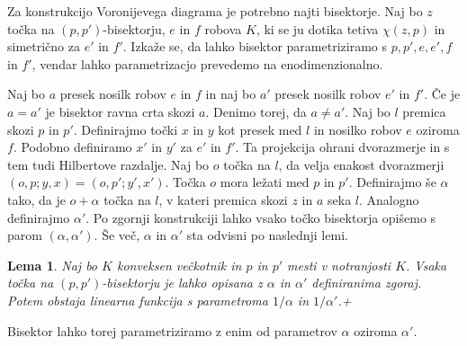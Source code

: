 \documentclass{article}
\newtheorem{lema}{Lema}
\begin{document}
Za konstrukcijo Voronijevega diagrama je potrebno najti bisektorje. Naj bo $z$ točka na $(p, p')$-bisektorju, $e$ in $f$ robova $K$, ki se ju dotika tetiva $\chi (z, p)$ in simetrično za $e'$ in $f'$.
Izkaže se, da lahko bisektor parametriziramo s $p, p', e, e', f$ in $f'$, vendar lahko parametrizacjo prevedemo na enodimenzionalno. 

Naj bo $a$ presek nosilk robov $e$ in $f$ in naj bo $a'$ presek nosilk robov $e'$ in $f'$. Če je $a = a'$ je bisektor ravna crta skozi $a$. Denimo torej, da $a \neq a'$. 
Naj bo $l$ premica skozi $p$ in $p'$. Definirajmo točki $x$ in $y$ kot presek med $l$ in nosilko robov $e$ oziroma $f$. Podobno definiramo $x'$ in $y'$ za $e'$ in $f'$.
Ta projekcija ohrani dvorazmerje in s tem tudi Hilbertove razdalje.
Naj bo $o$ točka na $l$, da velja enakost dvorazmerji $(o, p; y, x) = (o, p'; y', x')$. Točka $o$ mora ležati med $p$ in $p'$.
Definirajmo še $\alpha$ tako, da je $o + \alpha$ točka na $l$, v kateri premica skozi $z$ in $a$ seka $l$. Analogno definirajmo $\alpha'$. 
Po zgornji konstrukciji lahko vsako točko bisektorja opišemo s parom $(\alpha, \alpha')$.
Še več, $\alpha$ in $\alpha'$ sta odvisni po naslednji lemi.

\begin{lema}
    Naj bo $K$ konveksen večkotnik in $p$ in $p'$ mesti v notranjosti $K$.
    Vsaka točka na $(p, p')$-bisektorju je lahko opisana z $\alpha$ in $\alpha'$ definiranima zgoraj.
    Potem obstaja linearna funkcija s parametroma $1 / \alpha$ in $1 / \alpha'$.+
\end{lema}

Bisektor lahko torej parametriziramo z enim od parametrov $\alpha$ oziroma $\alpha'$.
\end{document}
